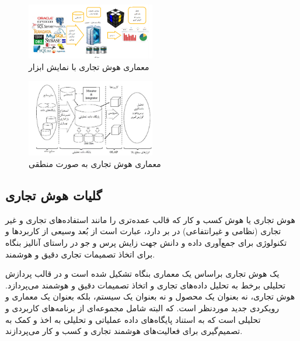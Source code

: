 \documentclass{llncs}
\begin{document}
\begin{figure}
\centering
\includegraphics[width=0.5\textwidth]{mahi/bi-2.jpg}
\centering
\caption{معماری هوش تجاری با نمایش ابزار}
\label{fig:bi-2}
\end{figure}
\begin{figure}
\centering
\includegraphics[width=0.5\textwidth]{mahi/bi-3.jpg}
\centering
\caption{معماری هوش تجاری به صورت منطقی}
\label{fig:bi-3}
\end{figure}

\subsection{گلیات هوش تجاری}
هوش تجاری یا هوش کسب و کار که قالب عمده‌تری را مانند استفاده‌های تجاری و غیر تجاری (نظامی و غیر‌انتفاعی) در بر دارد، عبارت است از بُعد وسیعی از کاربردها و تکنولوژی برای جمع‌آوری داده و دانش جهت زایش پرس و جو در راستای آنالیز بنگاه برای اتخاذ تصمیمات تجاری دقیق و هوشمند.

یک هوش تجاری براساس یک معماری بنگاه تشکیل شده است و در قالب پردازش تحلیلی برخط به تحلیل داده‌های تجاری و اتخاذ تصمیمات دقیق و هوشمند می‌پردازد. هوش تجاری، نه بعنوان یک محصول و نه بعنوان یک سیستم، بلکه بعنوان یک معماری و رویکردی جدید موردنظر است. که البته شامل مجموعه‌ای از برنامه‌های کاربردی و تحلیلی است که به استناد پایگاه‌های داده عملیاتی و تحلیلی به اخذ و کمک به تصمیم‌گیری برای فعالیت‌های هوشمند تجاری و کسب و کار می‌پردازند.
\end{document}
